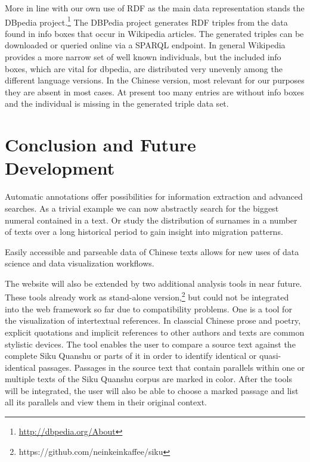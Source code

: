 \documentclass[12pt, draft]{article}
\begin{document}
More in line with our own use of RDF as the main data representation
stands the DBpedia project.\footnote{\url{http://dbpedia.org/About}}
The DBPedia project generates RDF triples from the data found in info boxes that occur in Wikipedia articles.
The generated triples can be downloaded or queried online via a SPARQL endpoint.
In general Wikipedia provides a more narrow set of well known individuals,
but the included info boxes, which are vital for dbpedia, are distributed
very unevenly among the different language versions. In the Chinese version,
most relevant for our purposes they are absent in most cases.
At present too many entries
are without info boxes and the individual is missing in the generated triple data set.

\section{Conclusion and Future Development}
Automatic annotations offer possibilities for information extraction and
advanced searches.  As a trivial example we can now abstractly search for the biggest
numeral contained in a text. Or study the distribution of surnames in a number of texts
over a long historical period to gain insight into migration patterns.

Easily accessible and parseable data of Chinese texts allows for new
uses of data science and data visualization workflows.

The website will also be extended by two additional analysis tools in near future. These tools already work as stand-alone version,\footnote{https://github.com/neinkeinkaffee/siku} but could not be integrated into the web framework so far due to compatibility problems.
One is a tool for the visualization of intertextual references. In classcial Chinese prose and poetry, explicit quotations and implicit references to other authors and texts are common stylistic devices. The tool enables the user to compare a source text against the complete Siku Quanshu or parts of it in order to identify identical or quasi-identical passages. Passages in the source text that contain parallels within one or multiple texts of the Siku Quanshu corpus are marked in color. After the tools will be integrated, the user will also be able to choose a marked passage and list all its parallels and view them in their original context.
\end{document}
